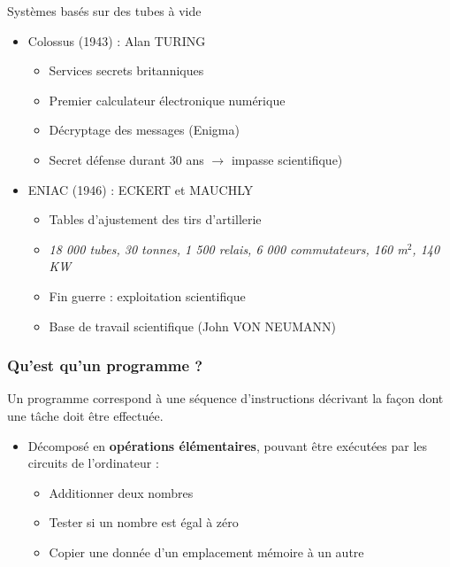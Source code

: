 \begin{frame}{Systèmes basés sur des tubes à vide}
\begin{itemize}
\item<1> Colossus (1943) : Alan TURING
\begin{itemize}
\item Services secrets britanniques
\item Premier calculateur électronique numérique
\item Décryptage des messages (Enigma)
\item Secret défense durant 30 ans $\rightarrow$ impasse scientifique)
\end{itemize}
\item<2> ENIAC (1946) : ECKERT et MAUCHLY
\begin{itemize}
\item Tables d'ajustement des tirs d'artillerie
\item \textit{18 000 tubes, 30 tonnes, 1 500 relais, 6 000 commutateurs, 160 m$^2$, 140 KW}
\item Fin guerre : exploitation scientifique
\item Base de travail scientifique (John VON NEUMANN)
\end{itemize}
\end{itemize}
\end{frame}

\begin{frame}
\frametitle{Qu'est qu'un programme ?}
\begin{definition}
Un programme correspond à une séquence d'instructions décrivant la façon dont une tâche doit être effectuée. \cite{tanen}
\end{definition}
\begin{itemize}
\item Décomposé en \textbf{opérations élémentaires}, pouvant être exécutées par les circuits de l'ordinateur :
\begin{itemize}
\item Additionner deux nombres
\item Tester si un nombre est égal à zéro
\item Copier une donnée d'un emplacement mémoire à un autre
\end{itemize}
\end{itemize}
\end{frame}


